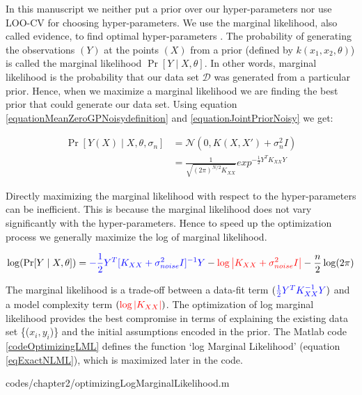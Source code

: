 In this manuscript we neither put a prior over our hyper-parameters nor use LOO-CV for choosing hyper-parameters. We use the marginal likelihood, also called evidence, to find optimal hyper-parameters \cite{mackay2003information}. The probability of generating the observations $(Y)$ at the points $(X)$ from a prior (defined by $k(x_{1}, x_{2}, \theta)$) is called the marginal likelihood $\Pr[Y \mid X, \theta]$. In other words, marginal likelihood is the probability that our data set $\mathcal{D}$ was generated from a particular prior. Hence, when we maximize a marginal likelihood we are finding the best prior that could generate our data set. Using equation \ref{equationMeanZeroGPNoisydefinition} and \ref{equationJointPriorNoisy} we get:

\begin{equation}\label{equationMarginalLikelihood}
\begin{aligned}
\Pr[Y(X) \mid X, \theta, \sigma_{n}] & = \mathcal{N}(0 , K(X, X') + \sigma^{2}_{n}I)  \\
& = \frac{1}{\sqrt{(2\pi)^{N/2} K_{XX}}} exp^{-\frac{1}{2}Y^{T}K_{XX}Y}
\end{aligned}
\end{equation}

Directly maximizing the marginal likelihood with respect to the hyper-parameters can be inefficient. This is because the marginal likelihood does not vary significantly with the hyper-parameters. Hence to speed up the optimization process we generally maximize the log of marginal likelihood. 

  \begin{equation}\label{eqExactNLML}
\log(\Pr [Y \mid X, \theta ]) = \textcolor{blue}{-\frac{1}{2}Y^{T}[K_{XX}+ \sigma_{noise}^{2}I]^{-1}Y} - \textcolor{red}{\log\left |  K_{XX}+ \sigma_{noise}^{2}I\right |} - \frac{n}{2}\log(2\pi)
  \end{equation}
  
The marginal likelihood is a trade-off between a data-fit term $( \textcolor{blue}{\frac{1}{2}Y^{T}K_{XX}^{-1}Y})$ and a model complexity term $( \textcolor{red}{\log\left |  K_{XX}\right |})$. The optimization of log marginal likelihood provides the best compromise in terms of explaining the existing data set \{($x_{i}, y_{i}$)\} and the initial assumptions encoded in the prior. The Matlab code \ref{codeOptimizingLML} defines the function `log Marginal Likelihood' (equation \ref{eqExactNLML}), which is maximized later in the code.

\begin{mdframed}[hidealllines=true,backgroundcolor=lightgray!20]

                    {codes/chapter2/optimizingLogMarginalLikelihood.m}
\end{mdframed}

